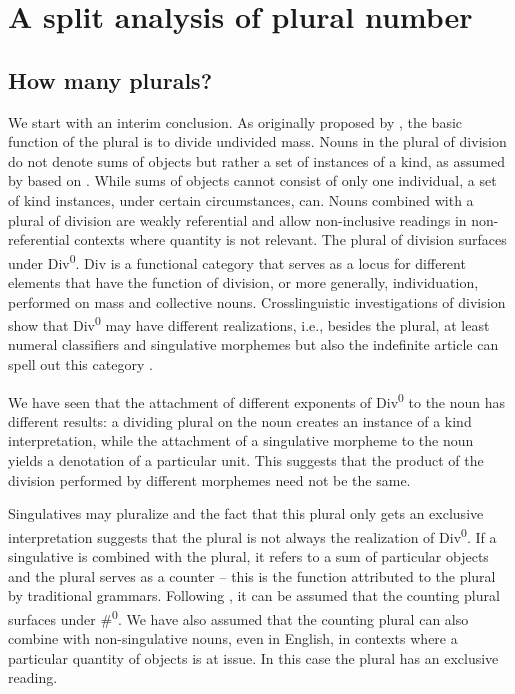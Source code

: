 \documentclass[output=paper,colorlinks,citecolor=brown,
]{langscibook}
\begin{document}

\section{A split analysis of plural number}\label{sec:4}

\subsection{How many plurals?}\label{sec:4.1}

We start with an interim conclusion. As originally proposed by \citet{Borer2005}, the basic function of the plural is to divide undivided mass. Nouns in the plural of division do not denote sums of objects but rather a set of instances of a kind, as assumed by \citet{Mathieu2012} based on \citet{Grimm2013}. While sums of objects cannot consist of only one individual, a set of kind instances, under certain circumstances, can. Nouns combined with a plural of division are weakly referential and allow non-inclusive readings in non-referential contexts where quantity is not relevant. The plural of division surfaces under Div\textsuperscript{0}. Div is a functional category that serves as a locus for different elements that have the function of division, or more generally, individuation, performed on mass and collective nouns. Crosslinguistic investigations of division show that Div\textsuperscript{0} may have different realizations, i.e., besides the plural, at least numeral classifiers and singulative morphemes but also the indefinite article can spell out this category \citep{Mathieu2012,Mathieu2014}. 

We have seen that the attachment of different exponents of Div\textsuperscript{0} to the noun has different results: a dividing plural on the noun creates an instance of a kind interpretation, while the attachment of a singulative morpheme to the noun yields a denotation of a particular unit. This suggests that the product of the division performed by different morphemes need not be the same. 

Singulatives may pluralize and the fact that this plural only gets an exclusive interpretation suggests that the plural is not always the realization of Div\textsuperscript{0}. If a singulative is combined with the plural, it refers to a sum of particular objects and the plural serves as a counter -- this is the function attributed to the plural by traditional grammars. Following \citet{Mathieu2012,Mathieu2014}, it can be assumed that the counting plural surfaces under \#\textsuperscript{0}. We have also assumed that the counting plural can also combine with non-singulative nouns, even in English, in contexts where a particular quantity of objects is at issue. In this case the plural has an exclusive reading.  
\end{document}
